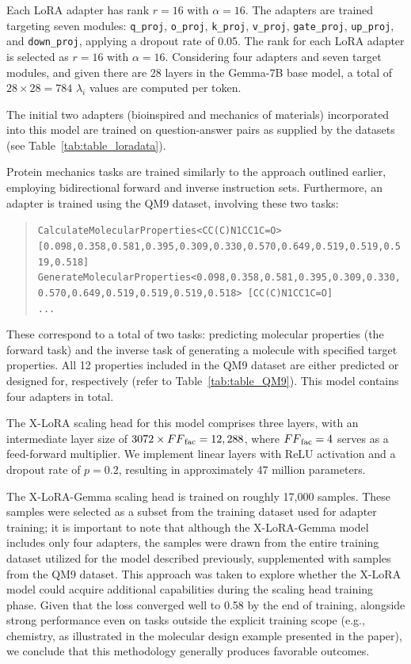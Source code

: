 Each LoRA adapter has rank $r=16$ with $\alpha=16$. The adapters are trained targeting seven modules: \texttt{q\_proj}, \texttt{o\_proj}, \texttt{k\_proj}, \texttt{v\_proj}, \texttt{gate\_proj}, \texttt{up\_proj}, and \texttt{down\_proj}, applying a dropout rate of 0.05. The rank for each LoRA adapter is selected as $r=16$ with $\alpha=16$. Considering four adapters and seven target modules, and given there are 28 layers in the Gemma-7B base model, a total of $28 \times 28 = 784$ $\lambda_i$ values are computed per token.

The initial two adapters (bioinspired and mechanics of materials) incorporated into this model are trained on question-answer pairs as supplied by the datasets (see Table~\ref{tab:table_loradata}).

Protein mechanics tasks are trained similarly to the approach outlined earlier, employing bidirectional forward and inverse instruction sets. Furthermore, an adapter is trained using the QM9 dataset, involving these two tasks:

\begin{quote}
\tiny {\texttt{CalculateMolecularProperties<CC(C)N1CC1C=O> [0.098,0.358,0.581,0.395,0.309,0.330,0.570,0.649,0.519,0.519,0.519,0.518]\\
GenerateMolecularProperties<0.098,0.358,0.581,0.395,0.309,0.330,0.570,0.649,0.519,0.519,0.519,0.518> [CC(C)N1CC1C=O]\\ 
...
}}
\end{quote}

These correspond to a total of two tasks: predicting molecular properties (the forward task) and the inverse task of generating a molecule with specified target properties. All 12 properties included in the QM9 dataset are either predicted or designed for, respectively (refer to Table~\ref{tab:table_QM9}).  
This model contains four adapters in total.  

The X-LoRA scaling head for this model comprises three layers, with an intermediate layer size of $3072 \times {FF}_{\rm fac} = 12,288$, where ${FF}_{\rm fac} = 4$ serves as a feed-forward multiplier. We implement linear layers with ReLU activation and a dropout rate of $p=0.2$, resulting in approximately 47 million parameters.  

The X-LoRA-Gemma scaling head is trained on roughly 17,000 samples. These samples were selected as a subset from the training dataset used for adapter training; it is important to note that although the X-LoRA-Gemma model includes only four adapters, the samples were drawn from the entire training dataset utilized for the model described previously, supplemented with samples from the QM9 dataset. This approach was taken to explore whether the X-LoRA model could acquire additional capabilities during the scaling head training phase. Given that the loss converged well to 0.58 by the end of training, alongside strong performance even on tasks outside the explicit training scope (e.g., chemistry, as illustrated in the molecular design example presented in the paper), we conclude that this methodology generally produces favorable outcomes.

